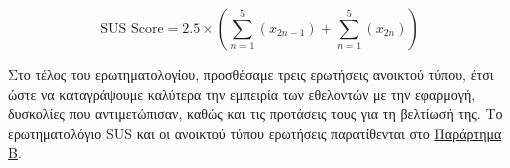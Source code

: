 \[
  \text{SUS Score} = 2.5 \times ( \sum_{n=1}^{5}(x_{2n - 1}) + \sum_{n=1}^{5}(x_{2n}))
\]

Στο τέλος του ερωτηματολογίου, προσθέσαμε τρεις ερωτήσεις ανοικτού τύπου, έτσι ώστε να καταγράψουμε καλύτερα την εμπειρία των εθελοντών με την εφαρμογή, δυσκολίες που αντιμετώπισαν, καθώς και τις προτάσεις τους για τη βελτίωσή της. Το ερωτηματολόγιο SUS και οι ανοικτού τύπου ερωτήσεις παρατίθενται στο \hyperref[ch:appendixB]{Παράρτημα Β}.

